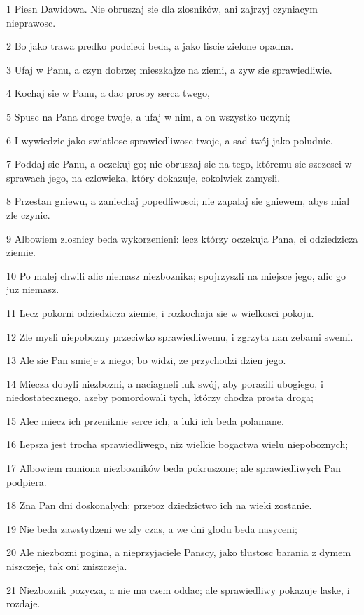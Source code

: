 \par 1 Piesn Dawidowa. Nie obruszaj sie dla zlosników, ani zajrzyj czyniacym nieprawosc.
\par 2 Bo jako trawa predko podcieci beda, a jako liscie zielone opadna.
\par 3 Ufaj w Panu, a czyn dobrze; mieszkajze na ziemi, a zyw sie sprawiedliwie.
\par 4 Kochaj sie w Panu, a dac prosby serca twego,
\par 5 Spusc na Pana droge twoje, a ufaj w nim, a on wszystko uczyni;
\par 6 I wywiedzie jako swiatlosc sprawiedliwosc twoje, a sad twój jako poludnie.
\par 7 Poddaj sie Panu, a oczekuj go; nie obruszaj sie na tego, któremu sie szczesci w sprawach jego, na czlowieka, który dokazuje, cokolwiek zamysli.
\par 8 Przestan gniewu, a zaniechaj popedliwosci; nie zapalaj sie gniewem, abys mial zle czynic.
\par 9 Albowiem zlosnicy beda wykorzenieni: lecz którzy oczekuja Pana, ci odziedzicza ziemie.
\par 10 Po malej chwili alic niemasz niezboznika; spojrzyszli na miejsce jego, alic go juz niemasz.
\par 11 Lecz pokorni odziedzicza ziemie, i rozkochaja sie w wielkosci pokoju.
\par 12 Zle mysli niepobozny przeciwko sprawiedliwemu, i zgrzyta nan zebami swemi.
\par 13 Ale sie Pan smieje z niego; bo widzi, ze przychodzi dzien jego.
\par 14 Miecza dobyli niezbozni, a naciagneli luk swój, aby porazili ubogiego, i niedostatecznego, azeby pomordowali tych, którzy chodza prosta droga;
\par 15 Alec miecz ich przeniknie serce ich, a luki ich beda polamane.
\par 16 Lepsza jest trocha sprawiedliwego, niz wielkie bogactwa wielu niepoboznych;
\par 17 Albowiem ramiona niezbozników beda pokruszone; ale sprawiedliwych Pan podpiera.
\par 18 Zna Pan dni doskonalych; przetoz dziedzictwo ich na wieki zostanie.
\par 19 Nie beda zawstydzeni we zly czas, a we dni glodu beda nasyceni;
\par 20 Ale niezbozni pogina, a nieprzyjaciele Panscy, jako tlustosc barania z dymem niszczeje, tak oni zniszczeja.
\par 21 Niezboznik pozycza, a nie ma czem oddac; ale sprawiedliwy pokazuje laske, i rozdaje.
